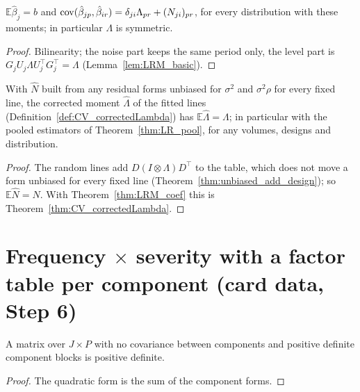 \begin{theorem}\label{thm:LRM_coef}
  \leanok
  $\mathbb E\hat\beta_j = b$ and $\operatorname{cov}(\hat\beta_{jp}, \hat\beta_{ir}) = \delta_{ji}\Lambda_{pr} + (N_{ji})_{pr}$,
  for every distribution with these moments; in particular $\Lambda$ is symmetric.
\end{theorem}
\begin{proof}
  \leanok
  Bilinearity; the noise part keeps the same period only, the level part is
  $G_jU_j\Lambda U_j^\top G_j^\top = \Lambda$ (Lemma~\ref{lem:LRM_basic}).
\end{proof}

\begin{theorem}\label{thm:LRM_corrected}
  \leanok
  With $\hat N$ built from any residual forms unbiased for $\sigma^2$ and $\sigma^2\rho$ for every
  fixed line, the corrected moment $\hat\Lambda$ of the fitted lines
  (Definition~\ref{def:CV_correctedLambda}) has $\mathbb E\hat\Lambda = \Lambda$; in particular with
  the pooled estimators of Theorem~\ref{thm:LR_pool}, for any volumes, designs and distribution.
\end{theorem}
\begin{proof}
  \leanok
  The random lines add $D(I \otimes \Lambda)D^\top$ to the table, which does not move a form
  unbiased for every fixed line (Theorem~\ref{thm:unbiased_add_design}); so
  $\mathbb E\hat N = N$. With Theorem~\ref{thm:LRM_coef} this is
  Theorem~\ref{thm:CV_correctedLambda}.
\end{proof}

\section*{Frequency $\times$ severity with a factor table per component (card data, Step 6)}

\begin{lemma}\label{lem:CV_posDef_blockDiag}
  \leanok
  A matrix over $J \times P$ with no covariance between components and positive definite
  component blocks is positive definite.
\end{lemma}
\begin{proof}
  \leanok
  The quadratic form is the sum of the component forms.
\end{proof}

